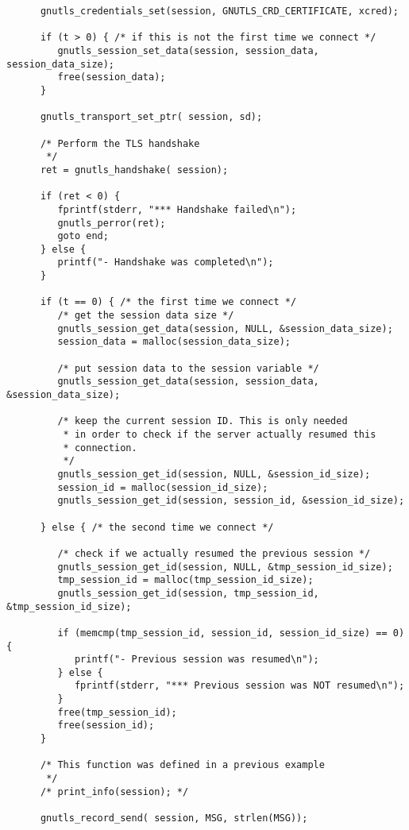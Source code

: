 \begin{verbatim}
      gnutls_credentials_set(session, GNUTLS_CRD_CERTIFICATE, xcred);

      if (t > 0) { /* if this is not the first time we connect */
         gnutls_session_set_data(session, session_data, session_data_size);
         free(session_data);
      }
      
      gnutls_transport_set_ptr( session, sd);

      /* Perform the TLS handshake
       */
      ret = gnutls_handshake( session);

      if (ret < 0) {
         fprintf(stderr, "*** Handshake failed\n");
         gnutls_perror(ret);
         goto end;
      } else {
         printf("- Handshake was completed\n");
      }

      if (t == 0) { /* the first time we connect */
         /* get the session data size */
         gnutls_session_get_data(session, NULL, &session_data_size);
         session_data = malloc(session_data_size);

         /* put session data to the session variable */
         gnutls_session_get_data(session, session_data, &session_data_size);

         /* keep the current session ID. This is only needed
          * in order to check if the server actually resumed this
          * connection.
          */
         gnutls_session_get_id(session, NULL, &session_id_size);
         session_id = malloc(session_id_size);
         gnutls_session_get_id(session, session_id, &session_id_size);

      } else { /* the second time we connect */

         /* check if we actually resumed the previous session */
         gnutls_session_get_id(session, NULL, &tmp_session_id_size);
         tmp_session_id = malloc(tmp_session_id_size);
         gnutls_session_get_id(session, tmp_session_id, &tmp_session_id_size);

         if (memcmp(tmp_session_id, session_id, session_id_size) == 0) {
            printf("- Previous session was resumed\n");
         } else {
            fprintf(stderr, "*** Previous session was NOT resumed\n");
         }
         free(tmp_session_id);
         free(session_id);
      }

      /* This function was defined in a previous example
       */
      /* print_info(session); */

      gnutls_record_send( session, MSG, strlen(MSG));


\end{verbatim}
